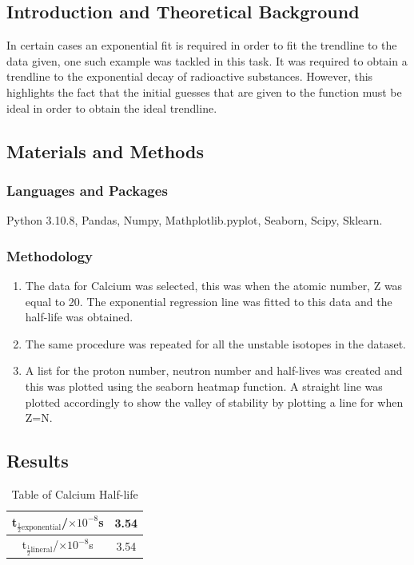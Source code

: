\documentclass[12pt, a4paper]{article}
\begin{document}
\subsection{Introduction and Theoretical Background}
In certain cases an exponential fit is required in order to fit the trendline to the data given, one such example was tackled in this task. It was required to obtain a trendline to the exponential decay of radioactive substances. However, this highlights the fact that the initial guesses that are given to the function must be ideal in order to obtain the ideal trendline.

\subsection{Materials and Methods}
\subsubsection{Languages and Packages}
Python 3.10.8, Pandas, Numpy, Mathplotlib.pyplot, Seaborn, Scipy, Sklearn. 

\subsubsection{Methodology}
\begin{enumerate}
    \item The data for Calcium was selected, this was when the atomic number, Z was equal to 20. The exponential regression line was fitted to this data and the half-life was obtained.
    \item The same procedure was repeated for all the unstable isotopes in the dataset. 
    \item A list for the proton number, neutron number and half-lives was created and this was plotted using the seaborn heatmap function. A straight line was plotted accordingly to show the valley of stability by plotting a line for when Z=N.
\end{enumerate}

\subsection{Results}
\begin{table}[H]
    \centering
    \begin{tabular}{|c|c|}
    \hline
    t\(_{\frac{1}{2}\mathrm{ exponential}}\)/\(\times 10^{-8}\)s & 3.54 \\ \hline
    t\(_{\frac{1}{2}\mathrm{ lineral}}\)/\(\times 10^{-8}\)s & 3.54 \\ \hline
    \end{tabular}
    \caption{Table of Calcium Half-life}
    \label{tab: Table 3.1}
\end{table}
\end{document}
